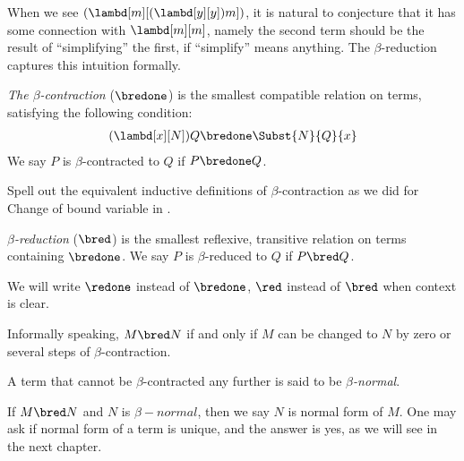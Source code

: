 \documentclass[../../../include/open-logic-section]{subfiles}
\begin{document}

When we see $(\lambd[m][(\lambd[y][y]) m])$, it is natural to
conjecture that it has some connection with $\lambd[m][m]$,
namely the second term should be the result of ``simplifying'' the first, if
``simplify'' means anything. The $\beta$-reduction captures this
intuition formally.

\begin{defn} 
  \emph{The $\beta$-contraction} ($\bredone$) is the smallest compatible
  relation on terms, satisfying the following condition:
  \begin{align*}
    (\lambd[x][N])Q \bredone \Subst{N}{Q}{x} 
  \end{align*}
  We say $P$ is $\beta$-contracted to $Q$ if $P \bredone Q$. 
\end{defn}

\begin{prob} 
  Spell out the equivalent inductive definitions of $\beta$-contraction as we
  did for Change of bound variable in .
\end{prob}
  
\begin{defn} 
  \emph{$\beta$-reduction} ($\bred$) is the smallest reflexive, transitive
  relation on terms containing $\bredone$.
  We say $P$ is $\beta$-reduced to $Q$ if $P \bred Q$.
\end{defn}
We will write $\redone$ instead of $\bredone$, $\red$ instead of
$\bred$ when context is clear.

Informally speaking, $M \bred N$  if and only if $M$ can be changed to
$N$ by zero or several steps of $\beta$-contraction.

\begin{defn}
A term that cannot be $\beta$-contracted any further is said to be
\emph{$\beta$-normal}. 
\end{defn}
If $M \bred N$ and $N$ is $\beta-normal$, then we say $N$ is normal
form of $M$. One may ask if normal form of a term is unique, and the
answer is yes, as we will see in the next chapter.
\end{document}
